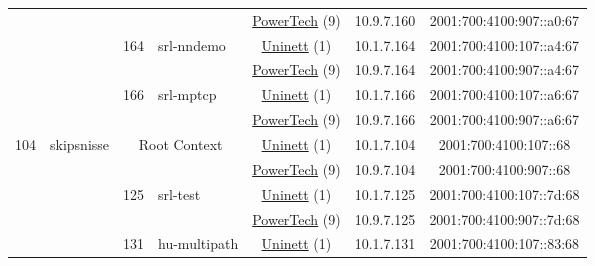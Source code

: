 \begin{small}
\begin{center}
\begin{longtable}{|c|c|c|c|c|c|c|c|}
  &  &  &  & \multicolumn{2}{|c|}{\tiny{\href{http://www.powertech.no}{PowerTech} (9)}} & \tiny{10.9.7.160} & \tiny{2001:700:4100:907::a0:67} \\* \cline{3-3}\cline{4-4}\cline{5-5}\cline{6-6}\cline{7-7}\cline{8-8}
  &  & \multirow{2}{*}{\tiny{164}} & \multicolumn{1}{|l|}{\multirow{2}{*}{\tiny{srl-nndemo}}} & \multicolumn{2}{|c|}{\tiny{\href{https://www.uninett.no}{Uninett} (1)}} & \tiny{10.1.7.164} & \tiny{2001:700:4100:107::a4:67} \\* \cline{5-5}\cline{6-6}\cline{7-7}\cline{8-8}
  &  &  &  & \multicolumn{2}{|c|}{\tiny{\href{http://www.powertech.no}{PowerTech} (9)}} & \tiny{10.9.7.164} & \tiny{2001:700:4100:907::a4:67} \\* \cline{3-3}\cline{4-4}\cline{5-5}\cline{6-6}\cline{7-7}\cline{8-8}
  &  & \multirow{2}{*}{\tiny{166}} & \multicolumn{1}{|l|}{\multirow{2}{*}{\tiny{srl-mptcp}}} & \multicolumn{2}{|c|}{\tiny{\href{https://www.uninett.no}{Uninett} (1)}} & \tiny{10.1.7.166} & \tiny{2001:700:4100:107::a6:67} \\* \cline{5-5}\cline{6-6}\cline{7-7}\cline{8-8}
  &  &  &  & \multicolumn{2}{|c|}{\tiny{\href{http://www.powertech.no}{PowerTech} (9)}} & \tiny{10.9.7.166} & \tiny{2001:700:4100:907::a6:67} \\ \hline
 \multirow{10}{*}{\tiny{104}} & \multicolumn{1}{|l|}{\multirow{10}{*}{\tiny{skipsnisse}}} & \multicolumn{2}{|c|}{\multirow{2}{*}{\tiny{Root Context}}} & \multicolumn{2}{|c|}{\tiny{\href{https://www.uninett.no}{Uninett} (1)}} & \tiny{10.1.7.104} & \tiny{2001:700:4100:107::68} \\* \cline{5-5}\cline{6-6}\cline{7-7}\cline{8-8}
  &  & \multicolumn{2}{|c|}{} & \multicolumn{2}{|c|}{\tiny{\href{http://www.powertech.no}{PowerTech} (9)}} & \tiny{10.9.7.104} & \tiny{2001:700:4100:907::68} \\* \cline{3-3}\cline{4-4}\cline{5-5}\cline{6-6}\cline{7-7}\cline{8-8}
  &  & \multirow{2}{*}{\tiny{125}} & \multicolumn{1}{|l|}{\multirow{2}{*}{\tiny{srl-test}}} & \multicolumn{2}{|c|}{\tiny{\href{https://www.uninett.no}{Uninett} (1)}} & \tiny{10.1.7.125} & \tiny{2001:700:4100:107::7d:68} \\* \cline{5-5}\cline{6-6}\cline{7-7}\cline{8-8}
  &  &  &  & \multicolumn{2}{|c|}{\tiny{\href{http://www.powertech.no}{PowerTech} (9)}} & \tiny{10.9.7.125} & \tiny{2001:700:4100:907::7d:68} \\* \cline{3-3}\cline{4-4}\cline{5-5}\cline{6-6}\cline{7-7}\cline{8-8}
  &  & \multirow{2}{*}{\tiny{131}} & \multicolumn{1}{|l|}{\multirow{2}{*}{\tiny{hu-multipath}}} & \multicolumn{2}{|c|}{\tiny{\href{https://www.uninett.no}{Uninett} (1)}} & \tiny{10.1.7.131} & \tiny{2001:700:4100:107::83:68} \\* \cline{5-5}\cline{6-6}\cline{7-7}\cline{8-8}

\end{longtable}
\end{center}
\end{small}
